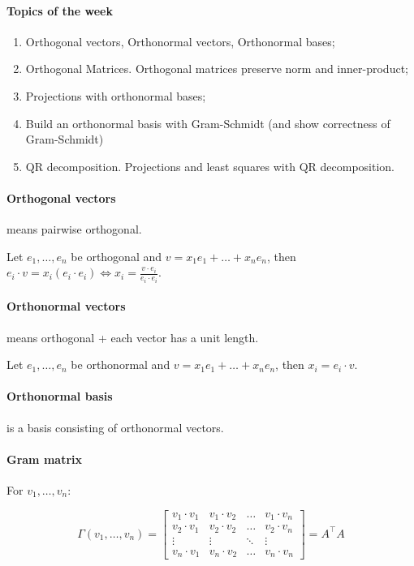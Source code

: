 \documentclass{article}
\begin{document}
\paragraph{Topics of the week} 

\begin{enumerate}
    \item Orthogonal vectors, Orthonormal vectors, Orthonormal bases;
    \item Orthogonal Matrices. Orthogonal matrices preserve norm and inner-product;
    \item Projections with orthonormal bases;
    \item Build an orthonormal basis with Gram-Schmidt (and show correctness of Gram-Schmidt)
    \item QR decomposition. Projections and least squares with QR decomposition.
\end{enumerate}

\paragraph{Orthogonal vectors} means pairwise orthogonal.


Let $e_1,\dots,e_n$ be orthogonal and $v = x_1 e_1 + \dots + x_n e_n$, then $e_i \cdot v = x_i (e_i \cdot e_i) \iff x_i = \frac{v \cdot e_i}{e_i \cdot e_i}$.

\paragraph{Orthonormal vectors} means orthogonal + each vector has a unit length.

Let $e_1,\dots,e_n$ be orthonormal and $v = x_1 e_1 + \dots + x_n e_n$, then $x_i = e_i \cdot v$.

\paragraph{Orthonormal basis} is a basis consisting of orthonormal vectors.

\paragraph{Gram matrix} For $v_1,\dots,v_n$:

$$
\Gamma(v_1,\dots,v_n) = \begin{bmatrix}
v_1 \cdot v_1 & v_1 \cdot v_2 & \dots & v_1 \cdot v_n \\
v_2 \cdot v_1 & v_2 \cdot v_2 & \dots & v_2 \cdot v_n \\
\vdots & \vdots & \ddots & \vdots \\
v_n \cdot v_1 & v_n \cdot v_2 & \dots & v_n \cdot v_n
\end{bmatrix} = A^\top A
$$
\end{document}
